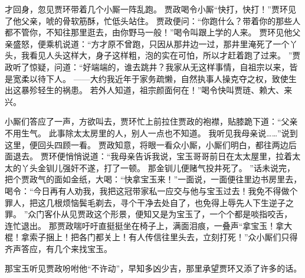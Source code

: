 才回身，忽见贾环带着几个小厮一阵乱跑。
贾政喝令小厮“快打，快打！”贾环见了他父亲，唬的骨软筋酥，忙低头站住。
贾政便问：“你跑什么？带着你的那些人都不管你，不知往那里逛去，由你野马一般！”喝令叫跟上学的人来。
贾环见他父亲盛怒，便乘机说道：“方才原不曾跑，只因从那井边一过，那井里淹死了一个丫头，我看见人头这样大，身子这样粗，泡的实在可怕，所以才赶着跑了过来。
”贾政听了惊疑，问道：“好端端的，谁去跳井？我家从无这样事情，自祖宗以来，皆是宽柔以待下人。
——大约我近年于家务疏懒，自然执事人操克夺之权，致使生出这暴殄轻生的祸患。
若外人知道，祖宗颜面何在！”喝令快叫贾琏、赖大、来兴。
\par
小厮们答应了一声，方欲叫去，贾环忙上前拉住贾政的袍襟，贴膝跪下道：“父亲不用生气。
此事除太太房里的人，别人一点也不知道。
我听见我母亲说……”说到这里，便回头四顾一看。
贾政知意，将眼一看众小厮，小厮们明白，都往两边后面退去。
贾环便悄悄说道：“我母亲告诉我说，宝玉哥哥前日在太太屋里，拉着太太的丫头金钏儿强奸不遂，打了一顿。
那金钏儿便赌气投井死了。
”话未说完，把个贾政气的面如金纸，大喝：“快拿宝玉来！”一面说，一面便往里边书房里去，喝令：“今日再有人劝我，我把这冠带家私一应交与他与宝玉过去！我免不得做个罪人，把这几根烦恼鬓毛剃去，寻个干净去处自了，也免得上辱先人下生逆子之罪。
”众门客仆从见贾政这个形景，便知又是为宝玉了，一个个都是啖指咬舌，
连忙退出。
那贾政喘吁吁直挺挺坐在椅子上，满面泪痕，一叠声“拿宝玉！拿大棍！拿索子捆上！把各门都关上！有人传信往里头去，立刻打死！”众小厮们只得齐声答应，有几个来找宝玉。
\par
那宝玉听见贾政吩咐他“不许动”，早知多凶少吉，那里承望贾环又添了许多的话。
